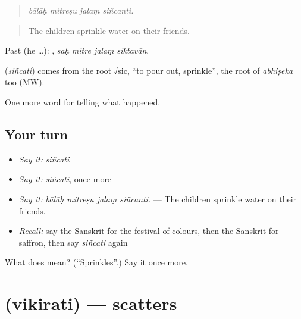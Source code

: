 \begin{quote}
   
\end{quote}

\begin{quote}
\emph{bālāḥ mitreṣu jalaṃ siñcanti.}
\end{quote}

\begin{quote}
The children sprinkle water on their friends.
\end{quote}

Past (he …):    , \emph{saḥ mitre jalaṃ siktavān}.

\begin{cousinweb}
\textbf{} (\emph{siñcati}) comes from the root √sic, \textquotedblleft{}to pour out, sprinkle\textquotedblright{}, the root of \emph{abhiṣeka} too (MW).
\end{cousinweb}

\begin{grammarlens}[title={What you've built}]
One more word for telling what happened.
\end{grammarlens}

\subsection*{Your turn}
\begin{itemize}
\raggedright
  \item \emph{Say it:} \emph{siñcati}
  \item \emph{Say it:} \emph{siñcati}, once more
  \item \emph{Say it:} \emph{bālāḥ mitreṣu jalaṃ siñcanti.} — The children sprinkle water on their friends.
  \item \emph{Recall:} say the Sanskrit for the festival of colours, then the Sanskrit for saffron, then say \emph{siñcati} again
\end{itemize}

\begin{tcolorbox}[breakable,colback=teal!4,colframe=teal!35!black,title={Before you move on}]
What does  mean? (\textquotedblleft{}Sprinkles\textquotedblright{}.) Say it once more.
\end{tcolorbox}
\section[\texorpdfstring{\sk{विकिरति} (vikirati)}{विकिरति (vikirati)}]{ (vikirati) — scatters}

